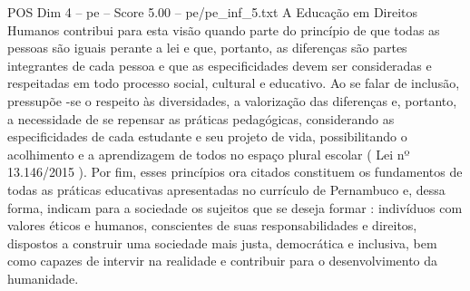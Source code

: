 \begin{textsample}{POS Dim 4 – pe – Score 5.00 – pe/pe\_inf\_5.txt}
A Educação em Direitos Humanos contribui para esta visão quando parte do princípio de que todas as pessoas são iguais perante a lei e que, portanto, as diferenças são partes integrantes de cada pessoa e que as especificidades devem ser consideradas e respeitadas em todo processo social, cultural e educativo.
Ao se falar de inclusão, pressupõe -se o respeito às diversidades, a valorização das diferenças e, portanto, a necessidade de se repensar as práticas pedagógicas, considerando as especificidades de cada estudante e seu projeto de vida, possibilitando o acolhimento e a aprendizagem de todos no espaço plural escolar ( Lei nº 13.146/2015 ).
Por fim, esses princípios ora citados constituem os fundamentos de todas as práticas educativas apresentadas no currículo de Pernambuco e, dessa forma, indicam para a sociedade os sujeitos que se deseja formar : indivíduos com valores éticos e humanos, conscientes de suas responsabilidades e direitos, dispostos a construir uma sociedade mais justa, democrática e inclusiva, bem como capazes de intervir na realidade e contribuir para o desenvolvimento da humanidade.

\end{textsample}
